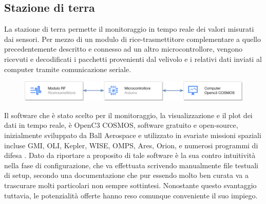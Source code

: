 \documentclass[12pt]{article}
\begin{document}
\subsection{Stazione di terra}
La stazione di terra permette il monitoraggio in tempo reale dei valori misurati dai sensori. Per mezzo di un modulo di rice-trasmettitore complementare a quello precedentemente descritto e connesso ad un altro microcontrollore, vengono ricevuti e decodificati i pacchetti provenienti dal velivolo e i relativi dati inviati al computer tramite comunicazione seriale. 

\begin{figure}[h]
	\centering
	\includegraphics[width=13cm]{img/GS-Arch}
\end{figure}

\noindent 
Il software che è stato scelto per il monitoraggio, la visualizzazione e il plot dei dati in tempo reale, è OpenC3 COSMOS, software gratuito e open-source, inizialmente sviluppato da Ball Aerospace e utilizzato in svariate missioni spaziali incluse GMI, OLI, Kepler, WISE, OMPS, Ares, Orion, e numerosi programmi di difesa \cite{cosmos}. Dato da riportare a proposito di tale software è la sua contro intuitività nella fase di configurazione, che va effettuata scrivendo manualmente file testuali di setup, secondo una documentazione che pur essendo molto ben curata va a trascurare molti particolari non sempre sottintesi. Nonostante questo svantaggio tuttavia, le potenzialità offerte hanno reso comunque conveniente il suo impiego.
\end{document}
